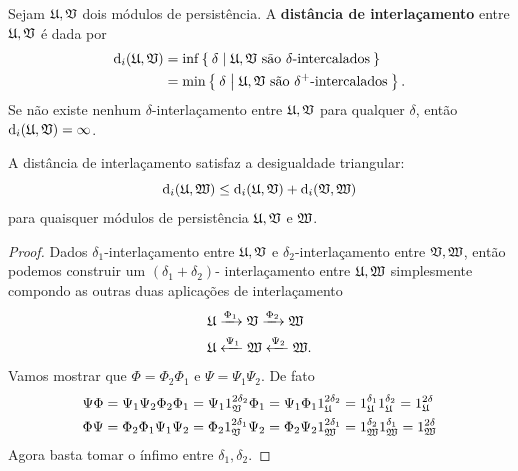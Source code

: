 \begin{defi}
    Sejam $\mathfrak{U}, \mathfrak{V}$ dois módulos de persistência. A \textbf{distância
    de interlaçamento} entre $\mathfrak{U}, \mathfrak{V}$ é dada por
    \begin{align*}
        \text{d}_i(\mathfrak{U}, \mathfrak{V}) &= \inf\Set{\delta | \mathfrak{U}, \mathfrak{V}\text{ são }
        \delta \text{-intercalados}} \\
        &=\min\Set{\delta | \mathfrak{U}, \mathfrak{V}\text{ são } \delta^+ 
        \text{-intercalados}}.
    \end{align*}
    Se não existe nenhum $\delta$-interlaçamento entre $\mathfrak{U}, \mathfrak{V}$ para
    qualquer $\delta$, então $\text{d}_i(\mathfrak{U}, \mathfrak{V}) = \infty$.
\end{defi}

\begin{propo}\label{teo:inter_triang}
    A distância de interlaçamento satisfaz a desigualdade triangular:
    \begin{equation*}
        \text{d}_i(\mathfrak{U}, \mathfrak{W}) \leq \text{d}_i(\mathfrak{U}, \mathfrak{V}) + \text{d}_i(\mathfrak{V}, \mathfrak{W})
    \end{equation*}
    para quaisquer módulos de persistência $\mathfrak{U}, \mathfrak{V}$ e $\mathfrak{W}$. 
\end{propo}
\begin{proof}
    Dados $\delta_1$-interlaçamento entre $\mathfrak{U}, \mathfrak{V}$ e $\delta_2$-interlaçamento
    entre $\mathfrak{V}, \mathfrak{W}$, então podemos construir um $(\delta_1 + \delta_2)$-
    interlaçamento entre $\mathfrak{U}, \mathfrak{W}$ simplesmente compondo as outras duas aplicações
    de interlaçamento
    \begin{align*}
        &\mathfrak{U} \xrightarrow{\Phi_1} \mathfrak{V} \xrightarrow{\Phi_2} \mathfrak{W} \\
        &\mathfrak{U} \xleftarrow{\Psi_1} \mathfrak{W} \xleftarrow{\Psi_2} \mathfrak{W}.
    \end{align*}
    Vamos mostrar que $\Phi = \Phi_2 \Phi_1$ e $\Psi = \Psi_1 \Psi_2$. De fato
    \begin{align*}
        & \Psi\Phi = \Psi_1\Psi_2\Phi_2\Phi_1 = \Psi_1 1^{2\delta_2}_{\mathfrak{V}} \Phi_1 
        = \Psi_1\Phi_1 1^{2\delta_2}_{\mathfrak{U}} = 1^{\delta_1}_{\mathfrak{U}} 1^{\delta_2}_{\mathfrak{U}}
        = 1^{2\delta}_{\mathfrak{U}} \\
        & \Phi\Psi = \Phi_2\Phi_1\Psi_1\Psi_2 = \Phi_2 1^{2\delta_1}_{\mathfrak{V}} \Psi_2 
        = \Phi_2\Psi_2 1^{2\delta_1}_{\mathfrak{W}} = 1^{\delta_2}_{\mathfrak{W}} 1^{\delta_1}_{\mathfrak{W}}
        = 1^{2\delta}_{\mathfrak{W}} 
    \end{align*}
    Agora basta tomar o ínfimo entre $\delta_1, \delta_2$.
\end{proof}

